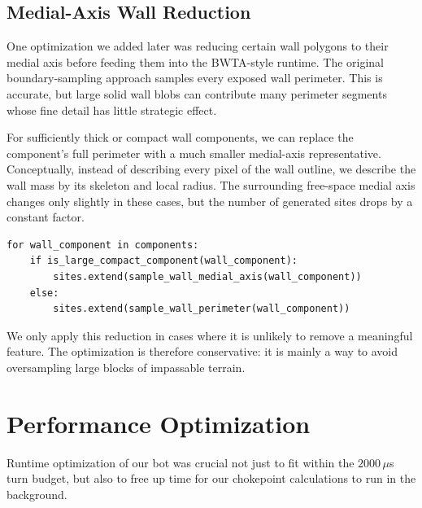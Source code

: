 \documentclass[10pt,sigconf,nonacm]{acmart}
\begin{document}
\subsection{Medial-Axis Wall Reduction}

One optimization we added later was reducing certain wall polygons to
their medial axis before feeding them into the BWTA-style runtime. The
original boundary-sampling approach samples every exposed wall perimeter.
This is accurate, but large solid wall blobs can contribute many perimeter
segments whose fine detail has little strategic effect.

For sufficiently thick or compact wall components, we can replace the
component's full perimeter with a much smaller medial-axis
representative. Conceptually, instead of describing every pixel of the
wall outline, we describe the wall mass by its skeleton and local radius.
The surrounding free-space medial axis changes only slightly in these
cases, but the number of generated sites drops by a constant factor.

\begin{lstlisting}
for wall_component in components:
    if is_large_compact_component(wall_component):
        sites.extend(sample_wall_medial_axis(wall_component))
    else:
        sites.extend(sample_wall_perimeter(wall_component))
\end{lstlisting}

We only apply this reduction in cases where it is unlikely to remove a meaningful feature.
The optimization is therefore conservative: it is mainly a way to avoid oversampling large blocks of impassable terrain.

\section{Performance Optimization}

Runtime optimization of our bot was crucial not just to fit within the $2000\,\mu$s turn budget,
but also to free up time for our chokepoint calculations to run in the background.
\end{document}
